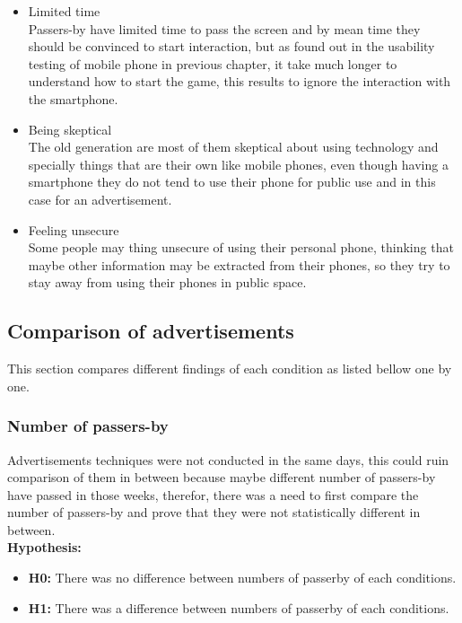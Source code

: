 \begin{enumerate}
\begin{itemize}
\item Limited time \\
Passers-by have limited time to pass the screen and by mean time they should be convinced to start interaction, but as found out in the usability testing of mobile phone in previous chapter, it take much longer to understand how to start the game, this results to ignore the interaction with the smartphone. 

\item Being skeptical \\
The old generation are most of them skeptical about using technology and specially things that are their own like mobile phones, even though having a smartphone they do not tend to use their phone for public use and in this case for an advertisement. 

\item Feeling unsecure \\
Some people may thing unsecure of using their personal phone, thinking that maybe other information may be extracted from their phones, so they try to stay away from using their phones in public space. 

\fi

\end{itemize}

\end{enumerate}


\newpage
\subsection{Comparison of advertisements}
This section compares different findings of each condition as listed bellow one by one. 

\subsubsection {Number of passers-by}
Advertisements techniques were not conducted in the same days, this could ruin comparison of them in between because maybe different number of passers-by have passed in those weeks, therefor, there was a need to first compare the number of passers-by and prove that they were not statistically different in between. \\

\textbf{Hypothesis:}
\begin{itemize}
\item \textbf{H0:} There was no difference between numbers of passerby of each conditions.
\item \textbf{H1:} There was a difference between numbers of passerby of each conditions.
\end{itemize}

